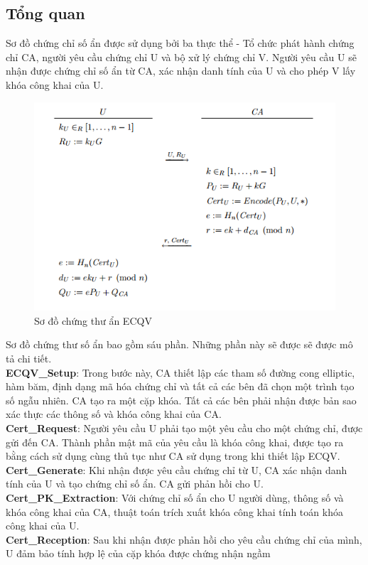 \documentclass[a4paper,12pt]{report}
\begin{document}
\subsection{Tổng quan}
Sơ đồ chứng chỉ số ẩn được sử dụng bởi ba thực thể - Tổ chức phát hành chứng chỉ CA, người yêu cầu chứng chỉ U và bộ xử lý chứng chỉ V. Người yêu cầu U sẽ nhận được chứng chỉ số ẩn từ CA, xác nhận danh tính của U và cho phép V lấy khóa công khai của U. 
\begin{figure}[h]\label{h3.1}
\begin{center}
\includegraphics[scale=0.9]{../im8.png}
\caption{Sơ đồ chứng thư ẩn ECQV}
\end{center}
\end{figure}

Sơ đồ chứng thư số ẩn bao gồm sáu phần. Những phần này sẽ được sẽ được mô tả chi tiết.\\
\textbf{ECQV\_Setup}: Trong bước này, CA thiết lập các tham số đường cong elliptic, hàm băm, định dạng mã hóa chứng chỉ và tất cả các bên đã chọn một trình tạo số ngẫu nhiên. CA tạo ra một cặp khóa. Tất cả các bên phải nhận được bản sao xác thực các thông số và khóa công khai của CA. \\[6pt]
\textbf{Cert\_Request}: Người yêu cầu U phải tạo một yêu cầu cho một chứng chỉ, được gửi đến CA. Thành phần mật mã của yêu cầu là khóa công khai, được tạo ra bằng cách sử dụng cùng thủ tục như CA sử dụng trong khi thiết lập ECQV. \\ [6pt]
\textbf{Cert\_Generate}: Khi nhận được yêu cầu chứng chỉ từ U, CA xác nhận danh tính của U và tạo chứng chỉ số ẩn. CA gửi phản hồi cho U. \\ [6pt]
\textbf{Cert\_PK\_Extraction}: Với chứng chỉ số ẩn cho U người dùng, thông số và khóa công khai của CA, thuật toán trích xuất khóa công khai tính toán khóa công khai của U. \\ [6pt]
\textbf{Cert\_Reception}: Sau khi nhận được phản hồi cho yêu cầu chứng chỉ của mình, U đảm bảo tính hợp lệ của cặp khóa được chứng nhận ngầm
\end{document}
